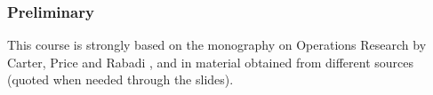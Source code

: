 
\begin{frame}
    \frametitle{Preliminary}
    This course is strongly based on the monography on Operations Research by Carter, Price and Rabadi \cite{carter}, and in material obtained from different sources (quoted when needed through the slides).
\end{frame}